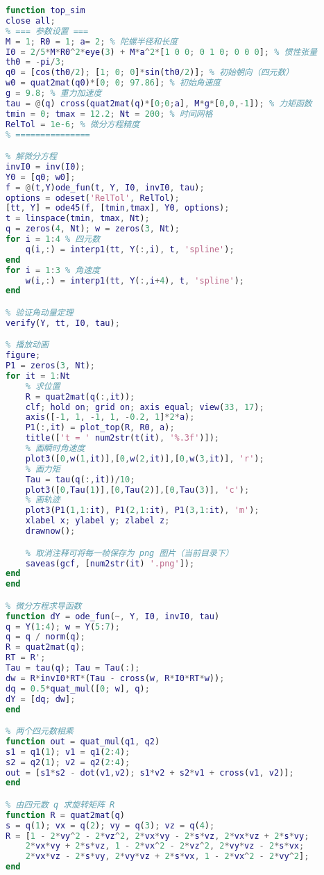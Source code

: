 \begin{lstlisting}[language=matlab, caption=top_sim.m]
% 陀螺的数值计算
function top_sim
close all;
% === 参数设置 ===
M = 1; R0 = 1; a= 2; % 陀螺半径和长度
I0 = 2/5*M*R0^2*eye(3) + M*a^2*[1 0 0; 0 1 0; 0 0 0]; % 惯性张量
th0 = -pi/3;
q0 = [cos(th0/2); [1; 0; 0]*sin(th0/2)]; % 初始朝向（四元数）
w0 = quat2mat(q0)*[0; 0; 97.86]; % 初始角速度
g = 9.8; % 重力加速度
tau = @(q) cross(quat2mat(q)*[0;0;a], M*g*[0,0,-1]); % 力矩函数
tmin = 0; tmax = 12.2; Nt = 200; % 时间网格
RelTol = 1e-6; % 微分方程精度
% ===============

% 解微分方程
invI0 = inv(I0);
Y0 = [q0; w0];
f = @(t,Y)ode_fun(t, Y, I0, invI0, tau);
options = odeset('RelTol', RelTol);
[tt, Y] = ode45(f, [tmin,tmax], Y0, options);
t = linspace(tmin, tmax, Nt);
q = zeros(4, Nt); w = zeros(3, Nt);
for i = 1:4 % 四元数
    q(i,:) = interp1(tt, Y(:,i), t, 'spline');
end
for i = 1:3 % 角速度
    w(i,:) = interp1(tt, Y(:,i+4), t, 'spline');
end

% 验证角动量定理
verify(Y, tt, I0, tau);

% 播放动画
figure;
P1 = zeros(3, Nt);
for it = 1:Nt
    % 求位置
    R = quat2mat(q(:,it));
    clf; hold on; grid on; axis equal; view(33, 17);
    axis([-1, 1, -1, 1, -0.2, 1]*2*a);
    P1(:,it) = plot_top(R, R0, a);
    title(['t = ' num2str(t(it), '%.3f')]);
    % 画瞬时角速度
    plot3([0,w(1,it)],[0,w(2,it)],[0,w(3,it)], 'r');
    % 画力矩
    Tau = tau(q(:,it))/10;
    plot3([0,Tau(1)],[0,Tau(2)],[0,Tau(3)], 'c');
    % 画轨迹
    plot3(P1(1,1:it), P1(2,1:it), P1(3,1:it), 'm');
    xlabel x; ylabel y; zlabel z;
    drawnow();

    % 取消注释可将每一帧保存为 png 图片（当前目录下）
    saveas(gcf, [num2str(it) '.png']);
end
end

% 微分方程求导函数
function dY = ode_fun(~, Y, I0, invI0, tau)
q = Y(1:4); w = Y(5:7);
q = q / norm(q);
R = quat2mat(q);
RT = R';
Tau = tau(q); Tau = Tau(:);
dw = R*invI0*RT*(Tau - cross(w, R*I0*RT*w));
dq = 0.5*quat_mul([0; w], q);
dY = [dq; dw];
end

% 两个四元数相乘
function out = quat_mul(q1, q2)
s1 = q1(1); v1 = q1(2:4);
s2 = q2(1); v2 = q2(2:4);
out = [s1*s2 - dot(v1,v2); s1*v2 + s2*v1 + cross(v1, v2)];
end

% 由四元数 q 求旋转矩阵 R
function R = quat2mat(q)
s = q(1); vx = q(2); vy = q(3); vz = q(4);
R = [1 - 2*vy^2 - 2*vz^2, 2*vx*vy - 2*s*vz, 2*vx*vz + 2*s*vy;
    2*vx*vy + 2*s*vz, 1 - 2*vx^2 - 2*vz^2, 2*vy*vz - 2*s*vx;
    2*vx*vz - 2*s*vy, 2*vy*vz + 2*s*vx, 1 - 2*vx^2 - 2*vy^2];
end


\end{lstlisting}
